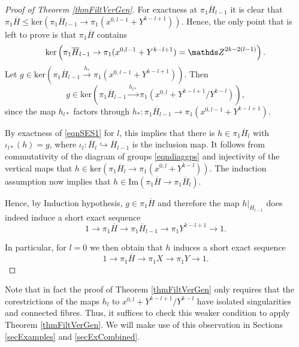 \begin{proof}[Proof of Theorem \ref{thmFiltVerGen}]
For exactness at $\pi_1 \overline{H}_{l-1}$ it is clear that $\pi_1 \overline{H}\leq \mathrm{ker}\left(\pi_1 \overline{H}_{l-1}\rightarrow \pi_1(x^{0,l-1}+Y^{k-l+1})\right)$. Hence, the only point that is left to prove is that $\pi_1 \overline{H}$ contains $$\mathrm{ker}\left(\pi_1 \overline{H}_{l-1}\rightarrow \pi_1(x^{0,l-1}+Y^{k-l+1})=\ZZ^{2k-2(l-1)}\right).$$
Let $g\in \mathrm{ker}\left(\pi_1 \overline{H}_{l-1}\stackrel{h_{\ast}}{\rightarrow} \pi_1(x^{0,l-1}+Y^{k-l+1}) \right)$. Then
\[
g\in \mathrm{ker}\left( \pi_1 \overline{H}_{l-1} \stackrel{h_{l\ast}}{\rightarrow} \pi_1 \left(x^{0,l}+ Y^{k-l+1}/Y^{k-l}\right)\right),
\]
since the map $h_{l\ast}$ factors through $h_{\ast}: \pi_1\overline{H}_{l-1}\rightarrow \pi_1(x^{0,l-1}+Y^{k-l+1})$.

By exactness of \eqref{eqnSES1} for $l$, this implies that there is $h\in \pi_1\overline{H}_l$ with $\iota_{l\ast}(h)=g$, where $\iota_l: \overline{H}_l\hookrightarrow \overline{H}_{l-1}$ is the inclusion map. It follows from commutativity of the diagram of groups \eqref{eqndiaggps} and injectivity of the vertical maps that $h\in \mathrm{ker}(\pi_1 \overline{H}_l\rightarrow \pi_1 (x^{0,l}+Y^{k-l}))$. The induction assumption now implies that $h\in \mathrm{Im} (\pi_1 \overline{H} \rightarrow \pi_1 \overline{H}_l)$.


Hence, by Induction hypothesis, $g\in \pi_1 \overline{H}$ and therefore the map $h|_{\overline{H}_{l-1}}$ does indeed induce a short exact sequence
\[
1\rightarrow \pi_1 \overline{H} \rightarrow \pi_1 \overline{H}_{l-1} \rightarrow \pi_1 Y^{k-l+1}\rightarrow 1.
\]

In particular, for $l=0$ we then obtain that $h$ induces a short exact sequence
\[
1\rightarrow \pi _1 \overline{H} \rightarrow \pi_1 X \rightarrow \pi_1 Y\rightarrow 1.
\]
\end{proof}

\begin{remark}
\label{rmkFiltVerGenWeak}
Note that in fact the proof of Theorem \ref{thmFiltVerGen} only requires that the corestrictions of the maps $h_l$ to $x^{0,l}+ Y^{k-l+1}/Y^{k-l}$ have isolated singularities and connected fibres. Thus, it suffices to check this weaker condition to apply Theorem \ref{thmFiltVerGen}. We will make use of this observation in Sections \ref{secExamples} and \ref{secExCombined}.
\end{remark}
